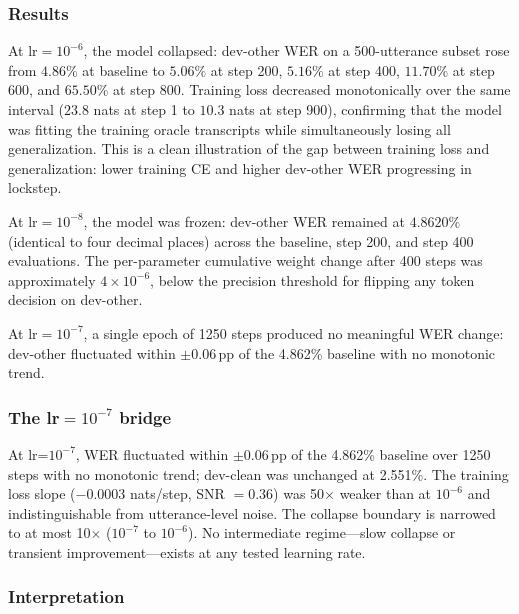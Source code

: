 \subsubsection{Results}

At lr$=10^{-6}$, the model collapsed: dev-other WER on a 500-utterance subset rose from $4.86\%$ at baseline to $5.06\%$ at step 200, $5.16\%$ at step 400, $11.70\%$ at step 600, and $65.50\%$ at step 800. Training loss decreased monotonically over the same interval ($23.8$ nats at step 1 to $10.3$ nats at step 900), confirming that the model was fitting the training oracle transcripts while simultaneously losing all generalization. This is a clean illustration of the gap between training loss and generalization: lower training CE and higher dev-other WER progressing in lockstep.

At lr$=10^{-8}$, the model was frozen: dev-other WER remained at $4.8620\%$ (identical to four decimal places) across the baseline, step 200, and step 400 evaluations. The per-parameter cumulative weight change after 400 steps was approximately $4 \times 10^{-6}$, below the precision threshold for flipping any token decision on dev-other.

At lr$=10^{-7}$, a single epoch of 1250 steps produced no meaningful WER change: dev-other fluctuated within $\pm 0.06$\,pp of the 4.862\% baseline with no monotonic trend.

\subsubsection{The lr$=10^{-7}$ bridge}

At lr=$10^{-7}$, WER fluctuated within $\pm 0.06$\,pp of the 4.862\% baseline over 1250 steps with no monotonic trend; dev-clean was unchanged at 2.551\%. The training loss slope ($-0.0003$ nats/step, SNR $= 0.36$) was 50$\times$ weaker than at $10^{-6}$ and indistinguishable from utterance-level noise. The collapse boundary is narrowed to at most 10$\times$ ($10^{-7}$ to $10^{-6}$). No intermediate regime---slow collapse or transient improvement---exists at any tested learning rate.

\subsubsection{Interpretation}

